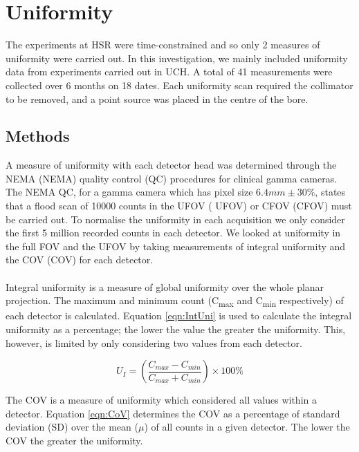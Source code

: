 \section{Uniformity}
The experiments at \acrshort{HSR} were time-constrained and so only 2 measures of uniformity were carried out. In this investigation, we mainly included uniformity data from experiments carried out in \acrshort{UCH}. A total of 41 measurements were collected over 6 months on 18 dates. Each uniformity scan required the collimator to be removed, and a point source was placed in the centre of the bore. 

\subsection{Methods}
A measure of uniformity with each detector head was determined through the \acrlong{NEMA} (\acrshort{NEMA}) quality control (QC) procedures for clinical gamma cameras. The \acrshort{NEMA} QC, for a gamma camera which has pixel size $6.4 mm \pm 30\%$, states that a flood scan of 10000 counts in the \acrlong{UFOV} ( \acrshort{UFOV}) or \acrlong{CFOV} (\acrshort{CFOV}) must be carried out. To normalise the uniformity in each acquisition we only consider the first 5 million recorded counts in each detector. We looked at uniformity in the full \acrshort{FOV} and the \acrshort{UFOV} by taking measurements of integral uniformity and the \acrlong{COV} (\acrshort{COV}) for each detector. 
\paragraph{}
Integral uniformity is a measure of global uniformity over the whole planar projection. The maximum and minimum count (C\textsubscript{max} and C\textsubscript{min} respectively) of each detector is calculated. Equation \ref{eqn:IntUni} is used to calculate the integral uniformity as a percentage; the lower the value the greater the uniformity. This, however, is limited by only considering two values from each detector. 

\begin{equation} \label{eqn:IntUni}
        U_{I} = (\frac{C_{max} - C_{min}}{C_{max} + C_{min}})\times100\%
\end{equation}

The \acrshort{COV} is a measure of uniformity which considered all values within a detector. Equation \ref{eqn:CoV} determines the \acrshort{COV} as a percentage of standard deviation (SD) over the mean ($\mu$) of all counts in a given detector. The lower the \acrshort{COV} the greater the uniformity. 

